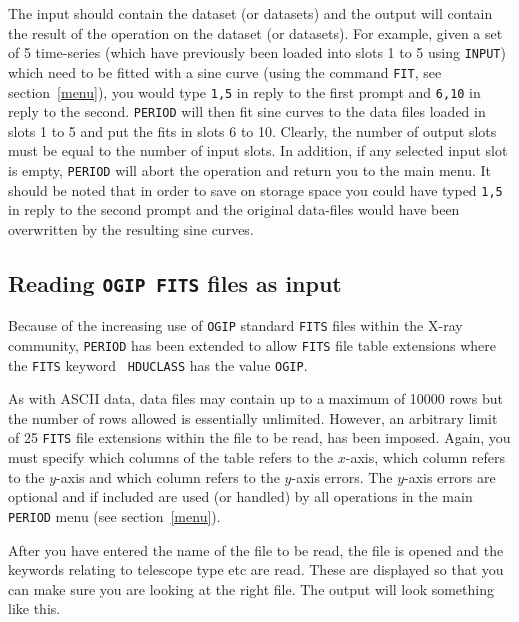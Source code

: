 The input should contain the dataset (or datasets) and the output will
contain the result of the operation on the dataset (or datasets). For
example, given a set of 5 time-series (which have previously been
loaded into slots 1 to 5 using {\tt INPUT}) which need to be fitted
with a sine curve (using the command {\tt FIT}, see
section~\ref{menu}), you would type {\tt 1,5} in reply to the first
prompt and {\tt 6,10} in reply to the second. {\tt PERIOD} will then
fit sine curves to the data files loaded in slots 1 to 5 and put the
fits in slots 6 to 10. Clearly, the number of output slots must be
equal to the number of input slots. In addition, if any selected input
slot is empty, {\tt PERIOD} will abort the operation and return you to
the main menu. It should be noted that in order to save on storage
space you could have typed {\tt 1,5} in reply to the second prompt and
the original data-files would have been overwritten by the resulting
sine curves.

\subsection{Reading {\tt OGIP FITS} files as input}
\label{slots2}

Because of the increasing use of {\tt OGIP} standard {\tt FITS} files
within the X-ray community, {\tt PERIOD} has been extended to allow
{\tt FITS} file table extensions where the {\tt FITS} keyword {\tt
HDUCLASS} has the value {\tt OGIP}.

As with ASCII data, data files may contain up to a maximum of 10000
rows but the number of rows allowed is essentially unlimited. However,
an arbitrary limit of 25 {\tt FITS} file extensions within the file to
be read, has been imposed.  Again, you must specify which columns of
the table refers to the $x$-axis, which column refers to the $y$-axis
and which column refers to the $y$-axis errors. The $y$-axis errors are
optional and if included are used (or handled) by all operations in the
main {\tt PERIOD} menu (see section~\ref{menu}).

After you have entered the name of the file to be read, the file is
opened and the keywords relating to telescope type etc are 
read. These are displayed so that you can make sure you are looking at 
the right file. The output will look something like this.

